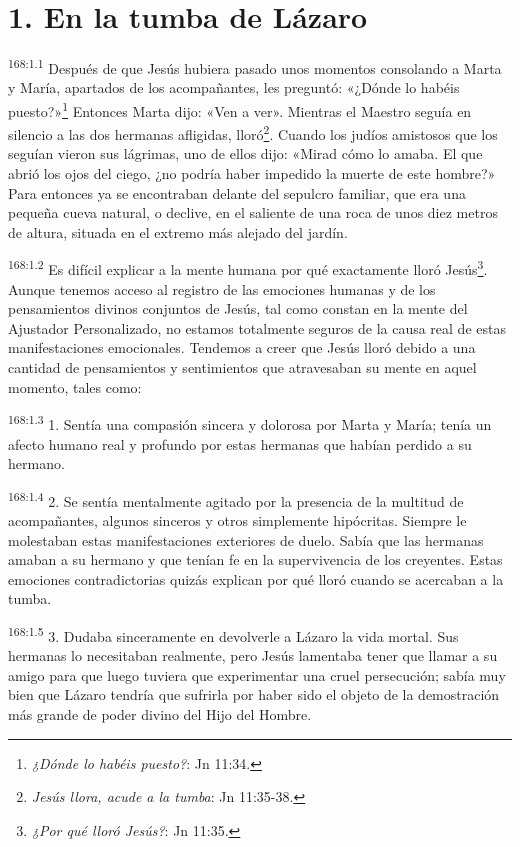 \section*{1. En la tumba de Lázaro}
\par 
\textsuperscript{168:1.1} Después de que Jesús hubiera pasado unos momentos consolando a Marta y María, apartados de los acompañantes, les preguntó: «¿Dónde lo habéis puesto?»\footnote{\textit{¿Dónde lo habéis puesto?}: Jn 11:34.} Entonces Marta dijo: «Ven a ver». Mientras el Maestro seguía en silencio a las dos hermanas afligidas, lloró\footnote{\textit{Jesús llora, acude a la tumba}: Jn 11:35-38.}. Cuando los judíos amistosos que los seguían vieron sus lágrimas, uno de ellos dijo: «Mirad cómo lo amaba. El que abrió los ojos del ciego, ¿no podría haber impedido la muerte de este hombre?» Para entonces ya se encontraban delante del sepulcro familiar, que era una pequeña cueva natural, o declive, en el saliente de una roca de unos diez metros de altura, situada en el extremo más alejado del jardín.

\par 
\textsuperscript{168:1.2} Es difícil explicar a la mente humana por qué exactamente lloró Jesús\footnote{\textit{¿Por qué lloró Jesús?}: Jn 11:35.}. Aunque tenemos acceso al registro de las emociones humanas y de los pensamientos divinos conjuntos de Jesús, tal como constan en la mente del Ajustador Personalizado, no estamos totalmente seguros de la causa real de estas manifestaciones emocionales. Tendemos a creer que Jesús lloró debido a una cantidad de pensamientos y sentimientos que atravesaban su mente en aquel momento, tales como:

\par 
\textsuperscript{168:1.3} 1. Sentía una compasión sincera y dolorosa por Marta y María; tenía un afecto humano real y profundo por estas hermanas que habían perdido a su hermano.

\par 
\textsuperscript{168:1.4} 2. Se sentía mentalmente agitado por la presencia de la multitud de acompañantes, algunos sinceros y otros simplemente hipócritas. Siempre le molestaban estas manifestaciones exteriores de duelo. Sabía que las hermanas amaban a su hermano y que tenían fe en la supervivencia de los creyentes. Estas emociones contradictorias quizás explican por qué lloró cuando se acercaban a la tumba.

\par 
\textsuperscript{168:1.5} 3. Dudaba sinceramente en devolverle a Lázaro la vida mortal. Sus hermanas lo necesitaban realmente, pero Jesús lamentaba tener que llamar a su amigo para que luego tuviera que experimentar una cruel persecución; sabía muy bien que Lázaro tendría que sufrirla por haber sido el objeto de la demostración más grande de poder divino del Hijo del Hombre.

